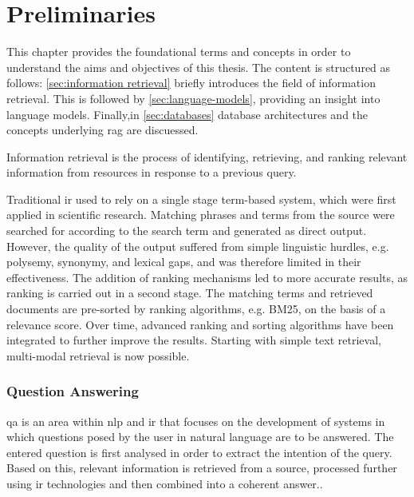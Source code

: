 \chapter{Preliminaries}\label{ch:preliminaries}
This chapter provides the foundational terms and concepts in order to understand the aims and objectives of this thesis.
%
The content is structured as follows: \cref{sec:information retrieval} briefly introduces the field of information retrieval. This is followed by \cref{sec:language-models}, providing an insight into language models. 
Finally,in \cref{sec:databases} database architectures and the concepts underlying \ac{rag} are discuessed. 
%
\begin{definition}\label{def:information retrieval}
Information retrieval is the process of identifying, retrieving, and ranking relevant information from resources in response to a previous query. 
\end{definition}
%
Traditional \ac{ir} used to rely on a single stage term-based system, which were first applied in scientific research. Matching phrases and terms from the source were searched for according to the search term and generated as direct output.
However, the quality of the output suffered from simple linguistic hurdles, e.g. polysemy, synonymy, and lexical gaps, and was therefore limited in their effectiveness. 
The addition of ranking mechanisms led to more accurate results, as ranking is carried out in a second stage. 
The matching terms and retrieved documents are pre-sorted by ranking algorithms, e.g. BM25, on the basis of a relevance score. 
Over time, advanced ranking and sorting algorithms have been integrated to further improve the results. \citep{hambardeIR2023}
Starting with simple text retrieval, multi-modal retrieval is now possible.
%
\subsection{Question Answering}\label{subsec:question answering}
\begin{definition}
\ac{qa} is an area within \ac{nlp} and \ac{ir} that focuses on the development of systems in which questions posed by the user in natural language are to be answered. 
The entered question is first analysed in order to extract the intention of the query. 
Based on this, relevant information is retrieved from a source, processed further using \ac{ir} technologies and then combined into a coherent answer.\citep{Manning2008}.
\end{definition}
%
